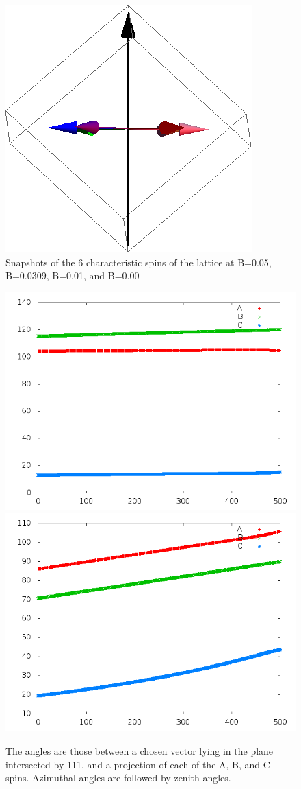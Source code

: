 \documentclass{article}
\begin{document}
\begin{figure}[ht]
\includegraphics[scale=0.27]{4S005to000G.png}
\caption{Snapshots of the 6 characteristic spins of the lattice at B=0.05, B=0.0309, B=0.01, and B=0.00}
\end{figure}
\pagebreak
\begin{figure}
\centering
\includegraphics[scale=0.5]{azim005to000.png}
\includegraphics[scale=0.5]{zen005to000.png}
\caption{The angles are those between a chosen vector lying in the plane intersected by 111,
and a projection of each of the A, B, and C spins. Azimuthal angles are followed by zenith angles.}
\end{figure}
\end{document}

